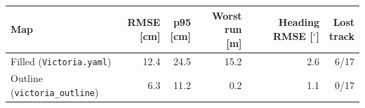 \begin{tabular}{lrrrrr}
\toprule
Map & \makecell[rb]{{RMSE} \\ {[cm]}} & \makecell[rb]{{p95} \\ {[cm]}} & \makecell[rb]{{Worst run} \\ {[m]}} & \makecell[rb]{{Heading} \\ {RMSE [$^\circ$]}} & \makecell[rb]{{Lost} \\ {track}} \\
\midrule
Filled (\texttt{Victoria.yaml}) & 12.4 & 24.5 & 15.2 & 2.6 & 6/17 \\
Outline (\texttt{victoria\_outline}) & 6.3 & 11.2 & 0.2 & 1.1 & 0/17 \\
\bottomrule
\end{tabular}
